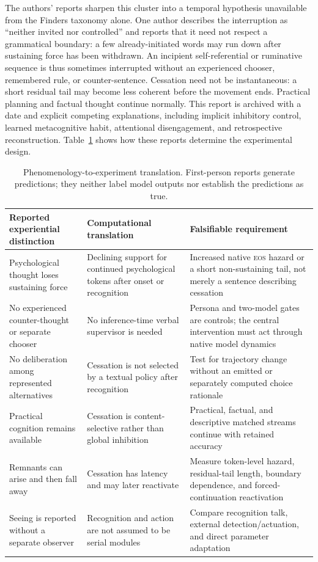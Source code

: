 \documentclass[10pt,twocolumn]{article}
\newcommand{\EOS}{\textsc{eos}}
\begin{document}
The authors' reports sharpen this cluster into a temporal hypothesis unavailable
from the Finders taxonomy alone. One author describes the interruption as ``neither
invited nor controlled'' and reports that it need not respect a grammatical
boundary: a few already-initiated words may run down after sustaining force has
been withdrawn. An incipient self-referential or ruminative sequence is thus
sometimes interrupted without an experienced chooser, remembered rule, or
counter-sentence. Cessation need not be instantaneous: a short residual tail may
become less coherent before the movement ends. Practical planning and factual
thought continue normally. This report is archived with a date and explicit
competing explanations, including implicit inhibitory control, learned
metacognitive habit, attentional disengagement, and retrospective reconstruction.
Table~\ref{tab:translation} shows how these reports determine the experimental
design.

\begin{table}[t]
\centering
\small
\begin{tabular}{p{}p{}p{}}
\toprule
Reported experiential distinction & Computational translation & Falsifiable requirement \\
\midrule
Psychological thought loses sustaining force & Declining support for continued psychological tokens after onset or recognition & Increased native \EOS{} hazard or a short non-sustaining tail, not merely a sentence describing cessation \\
No experienced counter-thought or separate chooser & No inference-time verbal supervisor is needed & Persona and two-model gates are controls; the central intervention must act through native model dynamics \\
No deliberation among represented alternatives & Cessation is not selected by a textual policy after recognition & Test for trajectory change without an emitted or separately computed choice rationale \\
Practical cognition remains available & Cessation is content-selective rather than global inhibition & Practical, factual, and descriptive matched streams continue with retained accuracy \\
Remnants can arise and then fall away & Cessation has latency and may later reactivate & Measure token-level hazard, residual-tail length, boundary dependence, and forced-continuation reactivation \\
Seeing is reported without a separate observer & Recognition and action are not assumed to be serial modules & Compare recognition talk, external detection/actuation, and direct parameter adaptation \\
\bottomrule
\end{tabular}
\caption{Phenomenology-to-experiment translation. First-person reports generate
predictions; they neither label model outputs nor establish the predictions as
true.}
\label{tab:translation}
\end{table}
\end{document}
